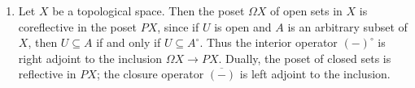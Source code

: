 \begin{example}
\begin{enumerate}
        \item Let \( X \) be a topological space.
        Then the poset \( \Omega X \) of open sets in \( X \) is coreflective in the poset \( PX \), since if \( U \) is open and \( A \) is an arbitrary subset of \( X \), then \( U \subseteq A \) if and only if \( U \subseteq A^\circ \).
        Thus the interior operator \( (-)^\circ \) is right adjoint to the inclusion \( \Omega X \to PX \).
        Dually, the poset of closed sets is reflective in \( PX \); the closure operator \( \overline{(-)} \) is left adjoint to the inclusion.
    \end{enumerate}
\end{example}
